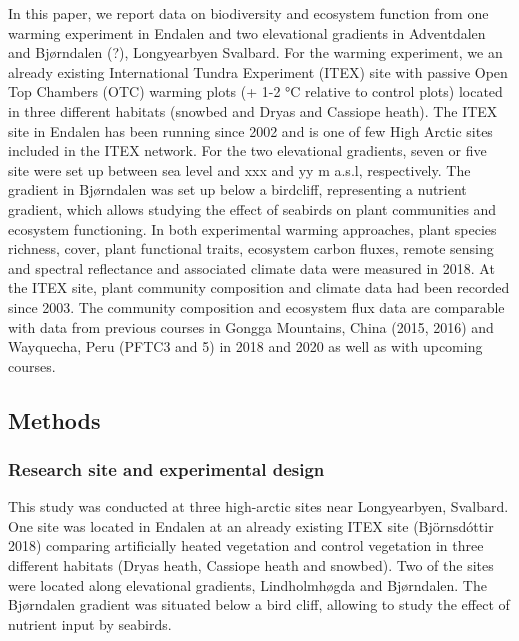 \documentclass[a4paper]{article}
\begin{document}
In this paper, we report data on biodiversity and ecosystem function from one warming experiment in Endalen and two elevational gradients in Adventdalen and Bjørndalen (?), Longyearbyen Svalbard.
For the warming experiment, we an already existing International Tundra Experiment (ITEX) site with passive Open Top Chambers (OTC) warming plots (+ 1-2 °C relative to control plots) located in three different habitats (snowbed and Dryas and Cassiope heath).
The ITEX site in Endalen has been running since 2002 and is one of few High Arctic sites included in the ITEX network.
For the two elevational gradients, seven or five site were set up between sea level and xxx and yy m a.s.l, respectively.
The gradient in Bjørndalen was set up below a birdcliff, representing a nutrient gradient, which allows studying the effect of seabirds on plant communities and ecosystem functioning.
In both experimental warming approaches, plant species richness, cover, plant functional traits, ecosystem carbon fluxes, remote sensing and spectral reflectance and associated climate data were measured in 2018. At the ITEX site, plant community composition and climate data had been recorded since 2003.
The community composition and ecosystem flux data are comparable with data from previous courses in Gongga Mountains, China (2015, 2016) and Wayquecha, Peru (PFTC3 and 5) in 2018 and 2020 as well as with upcoming courses.

\hypertarget{methods}{%
\subsection{Methods}\label{methods}}

\hypertarget{research-site-and-experimental-design}{%
\subsubsection{Research site and experimental design}\label{research-site-and-experimental-design}}

This study was conducted at three high-arctic sites near Longyearbyen, Svalbard.
One site was located in Endalen at an already existing ITEX site (Björnsdóttir 2018) comparing artificially heated vegetation and control vegetation in three different habitats (Dryas heath, Cassiope heath and snowbed).
Two of the sites were located along elevational gradients, Lindholmhøgda and Bjørndalen.
The Bjørndalen gradient was situated below a bird cliff, allowing to study the effect of nutrient input by seabirds.
\end{document}
